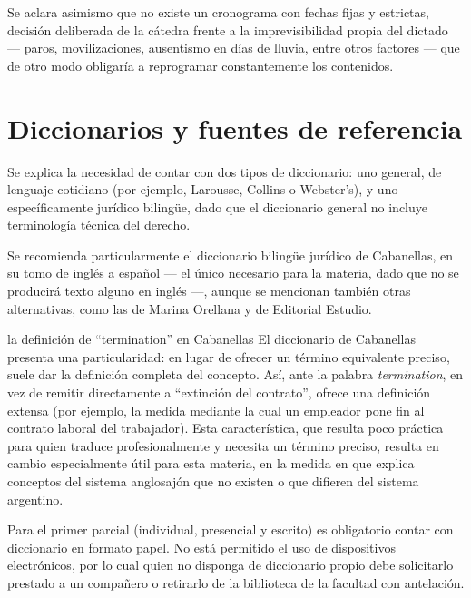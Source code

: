 \documentclass[12pt,oneside]{book}
\begin{document}
Se aclara asimismo que no existe un cronograma con fechas fijas y estrictas, decisión deliberada de la cátedra frente a la imprevisibilidad propia del dictado --- paros, movilizaciones, ausentismo en días de lluvia, entre otros factores --- que de otro modo obligaría a reprogramar constantemente los contenidos.

\section{Diccionarios y fuentes de referencia}

Se explica la necesidad de contar con dos tipos de diccionario: uno general, de lenguaje cotidiano (por ejemplo, Larousse, Collins o Webster's), y uno específicamente jurídico bilingüe, dado que el diccionario general no incluye terminología técnica del derecho.

Se recomienda particularmente el diccionario bilingüe jurídico de Cabanellas, en su tomo de inglés a español --- el único necesario para la materia, dado que no se producirá texto alguno en inglés ---, aunque se mencionan también otras alternativas, como las de Marina Orellana y de Editorial Estudio.

\begin{example}{la definición de ``termination'' en Cabanellas}
El diccionario de Cabanellas presenta una particularidad: en lugar de ofrecer un término equivalente preciso, suele dar la definición completa del concepto. Así, ante la palabra \textit{termination}, en vez de remitir directamente a ``extinción del contrato'', ofrece una definición extensa (por ejemplo, la medida mediante la cual un empleador pone fin al contrato laboral del trabajador). Esta característica, que resulta poco práctica para quien traduce profesionalmente y necesita un término preciso, resulta en cambio especialmente útil para esta materia, en la medida en que explica conceptos del sistema anglosajón que no existen o que difieren del sistema argentino.
\end{example}

\begin{important}
Para el primer parcial (individual, presencial y escrito) es obligatorio contar con diccionario en formato papel. No está permitido el uso de dispositivos electrónicos, por lo cual quien no disponga de diccionario propio debe solicitarlo prestado a un compañero o retirarlo de la biblioteca de la facultad con antelación.
\end{important}
\end{document}
